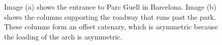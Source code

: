 \documentclass{thesis}
\begin{document}
\begin{figure}
\centering
{}
\caption[Parc Guell, Barcelona, Spain]{Image (a) shows the entrance to Parc Guell in Barcelona.  Image (b) shows the
columns supporting the roadway that runs past the park.  These columns form an offset catenary, which is asymmetric because the loading of
the arch is asymmetric. \footnotemark}
\label{fig:parc_guell}
\end{figure}
\end{document}
